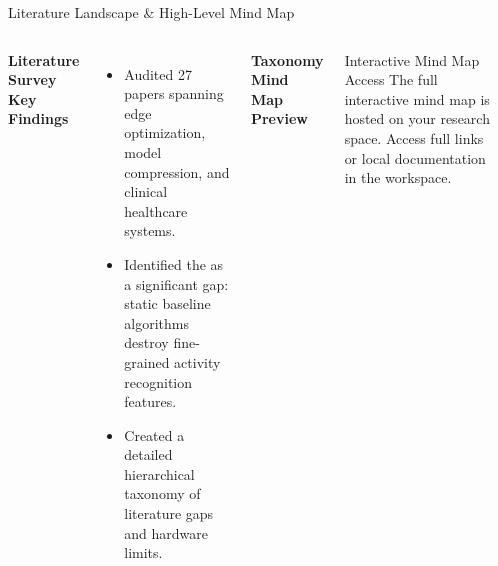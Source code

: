 \documentclass[10pt, aspectratio=169]{beamer}
\begin{document}
\begin{frame}{Literature Landscape \& High-Level Mind Map}
    \begin{columns}[T]
        \textbf{Literature Survey Key Findings}
        \begin{itemize}
            \item Audited 27 papers spanning edge optimization, model compression, and clinical healthcare systems.
            \item Identified the  as a significant gap: static baseline algorithms destroy fine-grained activity recognition features.
            \item Created a detailed hierarchical taxonomy of literature gaps and hardware limits.
        \end{itemize}

        \centering
        \textbf{Taxonomy Mind Map Preview}
        \vspace{0.2cm}

        \begin{block}{Interactive Mind Map Access}
            The full interactive mind map is hosted on your research space. Access full links or local documentation in the workspace.
        \end{block}

        \vspace{0.2cm}
        \begin{center}
            \setlength{\fboxrule}{0.5pt}
        \end{center}
    \end{columns}
\end{frame}
\end{document}
